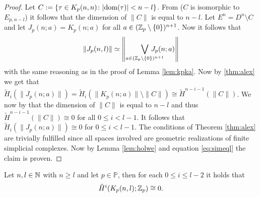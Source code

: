 \begin{proof}
  Let $C := \{\tau \in K_p(n,n)\colon |{\rm dom}(\tau)| < n - l\}$. From \cite[p. 2513, Remark]{mc2002} ($C$ is isomorphic to $E_{p,n-l}$) it follows that the dimension of $\lVert C \rVert$ is equal to $n-l$.
  Let $E^n = D^n\setminus C$ and let $J_p(n;a) = K_p(n;a)$ for all $a \in (\mathbb{Z}_p\setminus \{0\})^{n+1}$. Now it follows that
  \begin{equation}\label{eq:simeql}
    \lVert J_p(n,l) \rVert \simeq \left\lVert \bigvee\limits_{a \in (\Z_p \setminus \{0\})^{n+1}} \hspace*{-20px}J_p(n;a) \right\rVert
  \end{equation}
  with the same reasoning as in the proof of Lemma \ref{lem:kpka}.
  Now by \ref{thm:alex} we get that $\tilde{H}_i(\lVert J_p(n;a) \rVert) = \tilde{H}_i(\rVert K_p(n;a) \rVert \setminus \lVert C \rVert) \cong \tilde{H}^{n-i-1}(\lVert C\rVert)$. We now by that the dimension of $\lVert C \rVert$ is equal to $n-l$ and thus $\tilde{H}^{n-i-1}(\lVert C \rVert) \cong 0$ for all $0\leq i < l-1$. It follows that $\tilde{H}_i(\lVert J_p(n;a) \rVert) \cong 0$ for $0 \leq i < l-1$. The conditions of Theorem \ref{thm:alex} are trivially fulfilled since all spaces involved are geometric realizations of finite simplicial complexes. Now by Lemma \ref{lem:holwe} and equation \ref{eq:simeql} the claim is proven. 
\end{proof}

\begin{lemma}\label{lem:knp}
  Let $n, l \in \mathbb{N}$ with $n \geq l$ and let $p \in \mathbb{P}$, then for each $0 \leq i \leq l-2$ it holds that
  \begin{equation*}
    \tilde{H}^i(K_p(n,l); \mathbb{Z}_p) \cong 0.
  \end{equation*}
\end{lemma}

